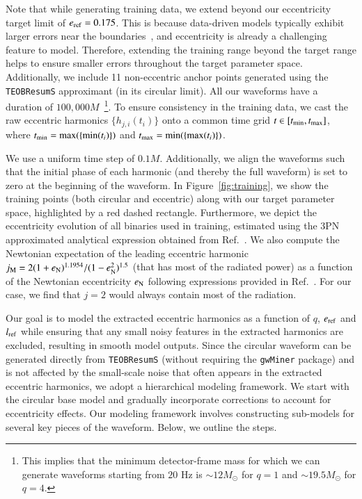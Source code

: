 \documentclass[aps,prd,amsmath,floats,floatfix, twocolumn,
superscriptaddress,nofootinbib,showpacs,longbibliography]{revtex4-1}
\begin{document}
Note that while generating training data, we extend beyond our eccentricity target limit of $e_{\rm ref} = 0.175$. This is because data-driven models typically exhibit larger errors near the boundaries~\cite{varma2019surrogate,Islam:2021mha}, and eccentricity is already a challenging feature to model. Therefore, extending the training range beyond the target range helps to ensure smaller errors throughout the target parameter space. Additionally, we include 11 non-eccentric anchor points generated using the \texttt{TEOBResumS} approximant (in its circular limit). 
All our waveforms have a duration of $100,000M$~\footnote{This implies that the minimum detector-frame mass for which we can generate waveforms starting from $20$ Hz is $\sim 12M_{\odot}$ for $q=1$ and $\sim 19.5M_{\odot}$ for $q=4$.}. To ensure consistency in the training data, we cast the raw eccentric harmonics $\{h_{j,i}(t_i)\}$ onto a common time grid $t \in [t_{\rm min},t_{\rm max}]$, where $t_{\rm min} = \max (\{\min(t_i)\})$ and $t_{\rm max} = \min (\{\max(t_i)\})$.

We use a uniform time step of $0.1M$. Additionally, we align the waveforms such that the initial phase of each harmonic (and thereby the full waveform) is set to zero at the beginning of the waveform.
In Figure~\ref{fig:training}, we show the training points (both circular and eccentric) along with our target parameter space, highlighted by a red dashed rectangle. Furthermore, we depict the eccentricity evolution of all binaries used in training, estimated using the 3PN approximated analytical expression obtained from Ref.~\cite{Moore:2016qxz}. We also compute the Newtonian expectation of the leading eccentric harmonic $j_{\rm M}=2(1+e_{\rm N})^{1.1954}/(1-e_{\rm N}^2)^{1.5}$ (that has most of the radiated power) as a function of the Newtonian eccentricity $e_{\rm N}$ following expressions provided in Ref.~\cite{Wen:2002km}. For our case, we find that $j=2$ would always contain most of the radiation.


Our goal is to model the extracted eccentric harmonics as a function of $q$, $e_{\rm ref}$ and $l_{\rm ref}$ while ensuring that any small noisy features in the extracted harmonics are excluded, resulting in smooth model outputs. Since the circular waveform can be generated directly from \texttt{TEOBResumS} (without requiring the \texttt{gwMiner} package) and is not affected by the small-scale noise that often appears in the extracted eccentric harmonics, we adopt a hierarchical modeling framework. We start with the circular base model and gradually incorporate corrections to account for eccentricity effects. Our modeling framework involves constructing sub-models for several key pieces of the waveform. Below, we outline the steps.
\end{document}
